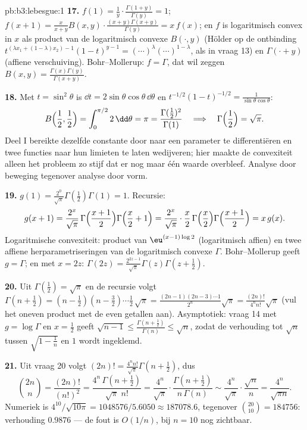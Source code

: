 \begin{solution}{pb:b3:lebesgue:1}
\textbf{17.} $f(1) = \frac1y\cdot\frac{\Gamma(1+y)}{\Gamma(y)} =
1$; $f(x+1) = \frac{x}{x+y}B(x,y)\cdot\frac{(x+y)\Gamma(x+y)}
{\Gamma(y)} = x\,f(x)$; en $f$ is logaritmisch convex in $x$ als
product van de logaritmisch convexe $B(\cdot, y)$ (Hölder op de
ontbinding $t^{(\lambda x_1 + (1-\lambda)x_2)-1}(1-t)^{y-1} =
(\cdots)^\lambda(\cdots)^{1-\lambda}$, als in vraag 13) en
$\Gamma(\cdot + y)$ (affiene verschuiving). Bohr--Mollerup: $f =
\Gamma$, dat wil zeggen $B(x, y) =
\frac{\Gamma(x)\Gamma(y)}{\Gamma(x+y)}$.

\textbf{18.} Met $t = \sin^2\theta$ is $\dd t =
2\sin\theta\cos\theta\,\dd\theta$ en $t^{-1/2}(1-t)^{-1/2} =
\frac1{\sin\theta\cos\theta}$:
\[
B\Bigl(\frac12, \frac12\Bigr) =
\int_0^{\pi/2}2\,\dd\theta = \pi
= \frac{\Gamma(\frac12)^2}{\Gamma(1)}
\quad\Longrightarrow\quad
\Gamma\Bigl(\frac12\Bigr) = \sqrt\pi .
\]
Deel I bereikte dezelfde constante door naar een parameter te
differentiëren en twee functies naar hun limieten te laten
wedijveren; hier maakte de convexiteit alleen het probleem zo
stijf dat er nog maar één waarde overbleef. Analyse door beweging
tegenover analyse door vorm.

\textbf{19.} $g(1) = \frac{2^0}{\sqrt\pi}\Gamma(\frac12)\Gamma(1)
= 1$. Recursie:
\[
g(x+1) = \frac{2^{x}}{\sqrt\pi}\,
\Gamma\Bigl(\frac{x+1}2\Bigr)\Gamma\Bigl(\frac x2 + 1\Bigr)
= \frac{2^{x}}{\sqrt\pi}\cdot\frac x2\,
\Gamma\Bigl(\frac x2\Bigr)\Gamma\Bigl(\frac{x+1}2\Bigr)
= x\,g(x) .
\]
Logaritmische convexiteit: product van $\eu^{(x-1)\log2}$
(logaritmisch affien) en twee affiene herparametriseringen van de
logaritmisch convexe $\Gamma$. Bohr--Mollerup geeft $g = \Gamma$;
en met $x = 2z$: $\Gamma(2z) =
\frac{2^{2z-1}}{\sqrt\pi}\Gamma(z)\Gamma(z + \frac12)$.

\textbf{20.} Uit $\Gamma(\frac12) = \sqrt\pi$ en de recursie volgt
$\Gamma(n + \frac12) = (n - \frac12)(n - \frac32)\cdots\frac12\,
\sqrt\pi = \frac{(2n-1)(2n-3)\cdots1}{2^n}\sqrt\pi =
\frac{(2n)!}{4^nn!}\sqrt\pi$ (vul het oneven product met de even
getallen aan). Asymptotiek: vraag 14 met $g = \log\Gamma$ en $x =
\frac12$ geeft $\sqrt{n-1} \leq
\frac{\Gamma(n+\frac12)}{\Gamma(n)} \leq \sqrt n$, zodat de
verhouding tot $\sqrt n$ tussen $\sqrt{1 - \frac1n}$ en $1$ wordt
ingeklemd.

\textbf{21.} Uit vraag 20 volgt $(2n)! =
\frac{4^nn!}{\sqrt\pi}\Gamma(n + \tfrac12)$, dus
\[
\binom{2n}n = \frac{(2n)!}{(n!)^2}
= \frac{4^n\,\Gamma(n+\frac12)}{\sqrt\pi\;n!}
= \frac{4^n}{\sqrt\pi}\cdot
\frac{\Gamma(n+\frac12)}{n\,\Gamma(n)}
\sim \frac{4^n}{\sqrt\pi}\cdot\frac{\sqrt n}{n}
= \frac{4^n}{\sqrt{\pi n}} .
\]
Numeriek is $4^{10}/\sqrt{10\pi} = 1048576/5.6050 \approx
187078.6$, tegenover $\binom{20}{10} = 184756$: verhouding
$0.9876$ --- de fout is $O(1/n)$, bij $n = 10$ nog zichtbaar.


\end{solution}
